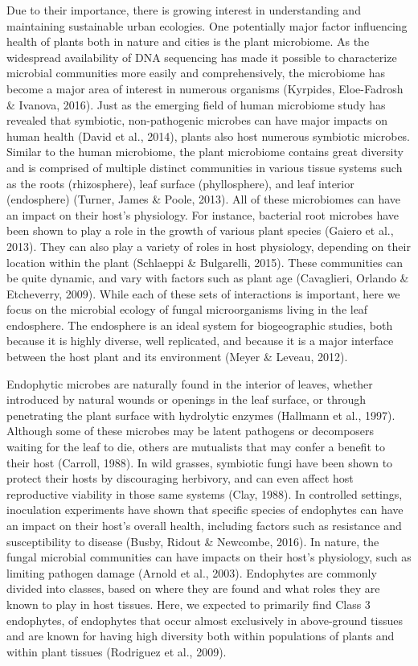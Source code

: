 \documentclass[fleqn,10pt,lineno]{wlpeerj} %
\begin{document}
Due to their importance, there is growing interest in understanding and maintaining sustainable urban ecologies. One potentially major factor influencing health of plants both in nature and cities is the plant microbiome. As the widespread availability of DNA sequencing has made it possible to characterize microbial communities more easily and comprehensively, the microbiome has become a major area of interest in numerous organisms (Kyrpides, Eloe-Fadrosh \& Ivanova, 2016). Just as the emerging field of human microbiome study has revealed that symbiotic, non-pathogenic microbes can have major impacts on human health (David et al., 2014), plants also host numerous symbiotic microbes. Similar to the human microbiome, the plant microbiome contains great diversity and is comprised of multiple distinct communities in various tissue systems such as the roots (rhizosphere), leaf surface (phyllosphere), and leaf interior (endosphere) (Turner, James \& Poole, 2013). All of these microbiomes can have an impact on their host's physiology. For instance, bacterial root microbes have been shown to play a role in the growth of various plant species (Gaiero et al., 2013). They can also play a variety of roles in host physiology, depending on their location within the plant (Schlaeppi \& Bulgarelli, 2015). These communities can be quite dynamic, and vary with factors such as plant age (Cavaglieri, Orlando \& Etcheverry, 2009). While each of these sets of interactions is important, here we focus on the microbial ecology of fungal microorganisms living in the leaf endosphere. The endosphere is an ideal system for biogeographic studies, both because it is highly diverse, well replicated, and because it is a major interface between the host plant and its environment (Meyer \& Leveau, 2012).

Endophytic microbes are naturally found in the interior of leaves, whether introduced by natural wounds or openings in the leaf surface, or through penetrating the plant surface with hydrolytic enzymes (Hallmann et al., 1997). Although some of these microbes may be latent pathogens or decomposers waiting for the leaf to die, others are mutualists that may confer a benefit to their host (Carroll, 1988). In wild grasses, symbiotic fungi have been shown to protect their hosts by discouraging herbivory, and can even affect host reproductive viability in those same systems (Clay, 1988). In controlled settings, inoculation experiments have shown that specific species of endophytes can have an impact on their host's overall health, including factors such as resistance and susceptibility to disease (Busby, Ridout \& Newcombe, 2016). In nature, the fungal microbial communities can have impacts on their host's physiology, such as limiting pathogen damage (Arnold et al., 2003). Endophytes are commonly divided into classes, based on where they are found and what roles they are known to play in host tissues. Here, we expected to primarily find Class 3 endophytes, of endophytes that occur almost exclusively in above-ground tissues and are known for having high diversity both within populations of plants and within plant tissues (Rodriguez et al., 2009).
\end{document}
